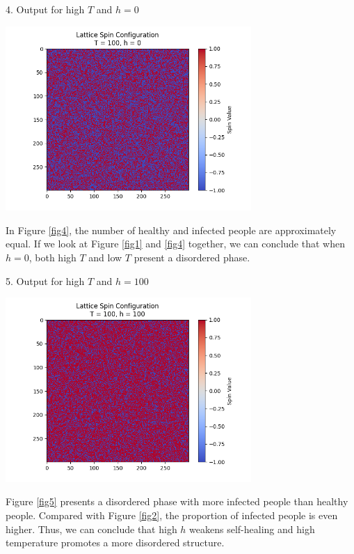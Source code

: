 \documentclass[11pt]{book}
\begin{document}
4. Output for high $T$ and $h=0$
\begin{center}
\captionsetup{type=figure}
    \includegraphics[width=0.7\textwidth]{nn, T=100, h=0.png}
    \label{fig4}
\end{center}
In Figure \eqref{fig4}, the number of healthy and infected people are approximately equal. If we look at Figure \eqref{fig1} and \eqref{fig4} together, we can conclude that when $h=0$, both high $T$ and low $T$ present a disordered phase.

5. Output for high $T$ and $h=100$
\begin{center}
\captionsetup{type=figure}
    \includegraphics[width=0.7\textwidth]{nn, T=100, h=100.png}
    \label{fig5}
\end{center}
Figure \eqref{fig5} presents a disordered phase with more infected people than healthy people. Compared with Figure \eqref{fig2}, the proportion of infected people is even higher. Thus, we can conclude that high $h$ weakens self-healing and high temperature promotes a more disordered structure.
\end{document}

